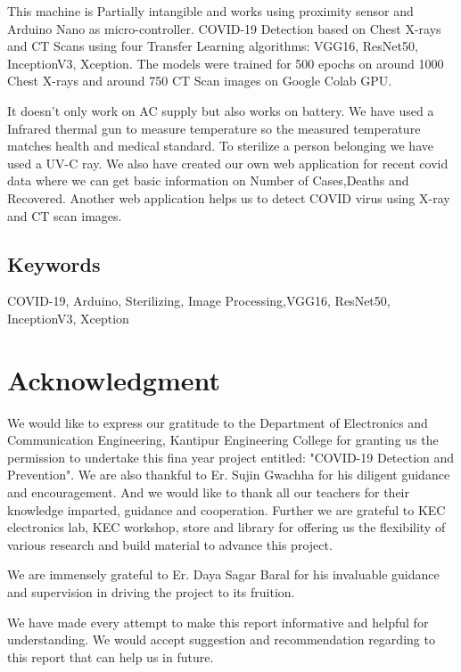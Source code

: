 \documentclass[a4paper,12pt]{report}
\begin{document}
This machine is Partially
intangible and works using proximity sensor and Arduino Nano as micro-controller. COVID-19 Detection based on Chest X-rays and CT Scans using four Transfer Learning algorithms: VGG16, ResNet50, InceptionV3, Xception. The models were trained for 500 epochs on around 1000 Chest X-rays and around 750 CT Scan images on Google Colab GPU.

It doesn’t only work on AC supply
but also works on battery. We have used a Infrared thermal gun to measure temperature
so the measured temperature matches health and medical standard. To sterilize a person
belonging we have used a UV-C ray. We also have created our own web application for recent covid data where we can get basic information on Number of Cases,Deaths and Recovered. Another web application helps us to detect COVID virus using X-ray and CT scan images.

\section*{Keywords}  
COVID-19, Arduino, Sterilizing, Image Processing,VGG16, ResNet50, InceptionV3, Xception
\pagebreak

\chapter*{Acknowledgment} 
We would like to express our gratitude to the Department of Electronics and Communication Engineering, Kantipur Engineering College for granting us the permission to undertake this fina year project entitled: "COVID-19 Detection and Prevention". We are also thankful to Er. Sujin Gwachha for his diligent guidance and encouragement. And we would like to thank all our teachers  for their knowledge imparted, guidance and cooperation. Further we are grateful to KEC electronics lab, KEC workshop, store and library for offering us the flexibility of various research and build material to advance this project.

We are immensely grateful to Er. Daya Sagar Baral for his invaluable guidance and supervision in driving the project to its fruition.

We have made every attempt to make this report informative and helpful for understanding.
We would accept suggestion and recommendation regarding to this report that can help us
in future.

%

\tableofcontents
{}
\thispagestyle{empty}
\pagebreak
\listoffigures
\thispagestyle{empty}
\pagebreak
\listoftables
\thispagestyle{empty}
\pagebreak
{}
\setcounter{page}{1}
\end{document}
